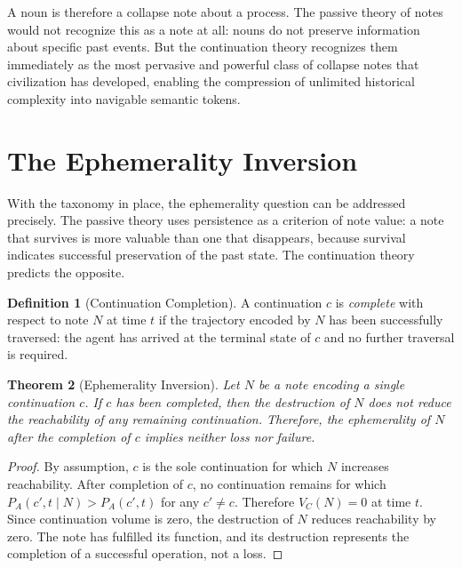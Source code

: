 \documentclass[12pt, a4paper]{article}
\theoremstyle{plain}
\newtheorem{theorem}{Theorem}[section]
\theoremstyle{definition}
\newtheorem{definition}[theorem]{Definition}
\theoremstyle{remark}
\begin{document}
A noun is therefore a collapse note about a process. The passive theory of notes
would not recognize this as a note at all: nouns do not preserve information about
specific past events. But the continuation theory recognizes them immediately as
the most pervasive and powerful class of collapse notes that civilization has
developed, enabling the compression of unlimited historical complexity into
navigable semantic tokens.

\section{The Ephemerality Inversion}

With the taxonomy in place, the ephemerality question can be addressed precisely.
The passive theory uses persistence as a criterion of note value: a note that
survives is more valuable than one that disappears, because survival indicates
successful preservation of the past state. The continuation theory predicts the
opposite.

\begin{definition}[Continuation Completion]
A continuation $c$ is \emph{complete} with respect to note $N$ at time $t$ if
the trajectory encoded by $N$ has been successfully traversed: the agent has
arrived at the terminal state of $c$ and no further traversal is required.
\end{definition}

\begin{theorem}[Ephemerality Inversion]
Let $N$ be a note encoding a single continuation $c$. If $c$ has been completed,
then the destruction of $N$ does not reduce the reachability of any remaining
continuation. Therefore, the ephemerality of $N$ after the completion of $c$
implies neither loss nor failure.
\end{theorem}

\begin{proof}
By assumption, $c$ is the sole continuation for which $N$ increases reachability.
After completion of $c$, no continuation remains for which $P_A(c', t \mid N)
> P_A(c', t)$ for any $c' \neq c$. Therefore $V_C(N) = 0$ at time $t$.
Since continuation volume is zero, the destruction of $N$ reduces reachability
by zero. The note has fulfilled its function, and its destruction represents
the completion of a successful operation, not a loss.
\end{proof}
\end{document}
